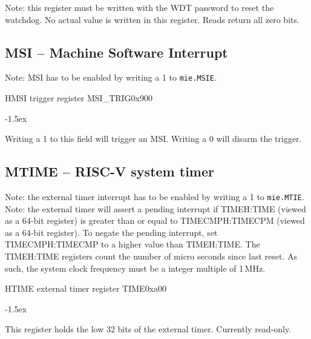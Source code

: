 \documentclass[12pt]{article}
\begin{document}
Note: this register must be written with the WDT password to reset the watchdog. No actual value is written in this register. Reads return all zero bits.


\subsection{MSI -- Machine Software Interrupt}
Note: MSI has to be enabled by writing a 1 to \lstinline[breaklines=false]|mie.MSIE|.

\begin{register}{H}{MSI trigger register MSI\_TRIG}{0x900}
\label{msitrig}
%
%
\regnewline%
\end{register}
\begin{regdesc}[0.8\textwidth]\begin{reglist}[00000]
\itemsep-1.5ex
\item [TRIG] Writing a 1 to this field will trigger an MSI. Writing a 0 will disarm the trigger.
\end{reglist}\end{regdesc}


\subsection{MTIME -- RISC-V system timer}
Note: the external timer interrupt has to be enabled by writing a 1 to \lstinline[breaklines=false]|mie.MTIE|.
Note: the external timer will assert a pending interrupt if TIMEH:TIME (viewed as a 64-bit register) is greater than or equal to TIMECMPH:TIMECPM (viewed as a 64-bit register). To negate the pending interrupt, set TIMECMPH:TIMECMP to a higher value than TIMEH:TIME. The TIMEH:TIME registers count the number of micro seconds since last reset. As such, the system clock frequency must be a integer multiple of 1\,MHz.

\begin{register}{H}{TIME external timer register TIME}{0xa00}
\label{time}
\regnewline%
\end{register}
\begin{regdesc}[0.8\textwidth]\begin{reglist}[00000]
\itemsep-1.5ex
\item [TIME] This register holds the low 32 bits of the external timer. Currently read-only.
\end{reglist}\end{regdesc}
\end{document}
